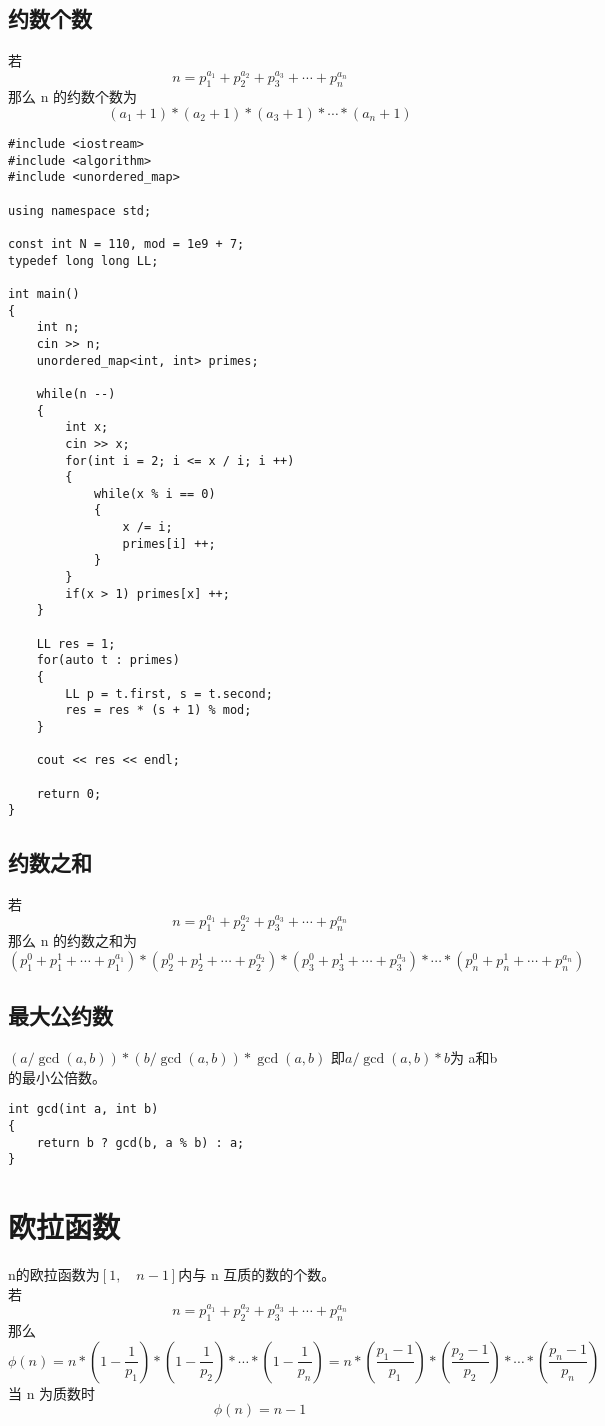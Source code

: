 \documentclass[]{book}
\begin{document}
\section{约数个数}
若 
\[n = p_{1}^{a_{1}} + p_{2}^{a_{2}} + p_{3}^{a_{3}} +\cdots+ p_{n}^{a_{n}}\]
那么 n 的约数个数为
\[(a_{1} + 1) * (a_{2} + 1) * (a_{3} + 1) *\cdots* (a_{n} + 1)\]
\begin{lstlisting}
#include <iostream>
#include <algorithm>
#include <unordered_map>

using namespace std;

const int N = 110, mod = 1e9 + 7;
typedef long long LL;

int main()
{
    int n;
    cin >> n;
    unordered_map<int, int> primes;
    
    while(n --)
    {
        int x;
        cin >> x;
        for(int i = 2; i <= x / i; i ++)
        {
            while(x % i == 0)
            {
                x /= i;
                primes[i] ++;
            }
        }
        if(x > 1) primes[x] ++;
    }
    
    LL res = 1;
    for(auto t : primes)
    {
        LL p = t.first, s = t.second;
        res = res * (s + 1) % mod;
    }
    
    cout << res << endl;
    
    return 0;
}
\end{lstlisting}
\section{约数之和}
若
\[n = p_{1}^{a_{1}} + p_{2}^{a_{2}} + p_{3}^{a_{3}} +\cdots+ p_{n}^{a_{n}}\]
那么 n 的约数之和为
\[(p_{1}^{0} + p_{1}^{1} + \cdots + p_{1}^{a_{1}}) * (p_{2}^{0} + p_{2}^{1} + \cdots + p_{2}^{a_{2}}) * (p_{3}^{0} + p_{3}^{1} + \cdots + p_{3}^{a_{3}}) *\cdots*(p_{n}^{0} + p_{n}^{1} + \cdots + p_{n}^{a_{n}})\]
\section{最大公约数}
$(a / \gcd(a, b)) * (b / \gcd(a, b))* \gcd(a, b)$ 即$a / \gcd(a, b) * b$为 a和b 的最小公倍数。
\begin{lstlisting}
int gcd(int a, int b)
{
    return b ? gcd(b, a % b) : a;
}
\end{lstlisting}
\chapter{欧拉函数}
n的欧拉函数为$[1,\quad n - 1]$内与 n 互质的数的个数。\\
若 
\[n = p_{1}^{a_{1}} + p_{2}^{a_{2}} + p_{3}^{a_{3}} +\cdots + p_{n}^{a_{n}}\]
那么
\[\phi(n) = n * (1 - \frac{1}{p_{1}}) * (1 - \frac{1}{p_{2}}) *\cdots* (1 - \frac{1}{p_{n}}) = 
n*(\frac{p_{1} - 1}{p_{1}})*(\frac{p_{2} - 1}{p_{2}})*\cdots *(\frac{p_{n} - 1}{p_{n}})\]
当 n 为质数时
\[\phi(n) = n - 1\]
\end{document}
